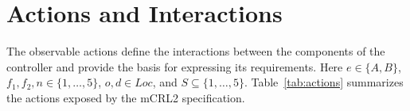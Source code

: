 \section{Actions and Interactions}
\label{sec:actions}

The observable actions define the interactions between the components of the controller and provide the basis for expressing its requirements. Here \(e\in\{A,B\}\), \(f_1,f_2,n\in\{1,\ldots,5\}\), \(o,d\in Loc\), and \(S\subseteq\{1,\ldots,5\}\). Table~\ref{tab:actions} summarizes the actions exposed by the mCRL2 specification.

